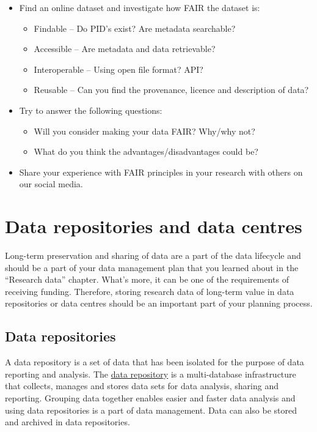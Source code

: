 \documentclass[
]{book}
\providecommand{\tightlist}{%
  \setlength{\itemsep}{0pt}\setlength{\parskip}{0pt}}
\begin{document}
\begin{itemize}
\item
  Find an online dataset and investigate how FAIR the dataset is:

  \begin{itemize}
  \tightlist
  \item
    Findable -- Do PID's exist? Are metadata searchable?
  \item
    Accessible -- Are metadata and data retrievable?
  \item
    Interoperable -- Using open file format? API?
  \item
    Reusable -- Can you find the provenance, licence and description of data?
  \end{itemize}
\item
  Try to answer the following questions:

  \begin{itemize}
  \tightlist
  \item
    Will you consider making your data FAIR? Why/why not?
  \item
    What do you think the advantages/disadvantages could be?
  \end{itemize}
\item
  Share your experience with FAIR principles in your research with others on our social media.
\end{itemize}

\hypertarget{data-repositories-and-data-centres}{%
\chapter{Data repositories and data centres}\label{data-repositories-and-data-centres}}

Long-term preservation and sharing of data are a part of the data lifecycle and should be a part of your data management plan that you learned about in the ``Research data'' chapter. What's more, it can be one of the requirements of receiving funding. Therefore, storing research data of long-term value in data repositories or data centres should be an important part of your planning process.

\hypertarget{data-repositories}{%
\section{Data repositories}\label{data-repositories}}

A data repository is a set of data that has been isolated for the purpose of data reporting and analysis. The \href{http://digitalguardian.com/blog/what-data-repository}{data repository} is a multi-database infrastructure that collects, manages and stores data sets for data analysis, sharing and reporting. Grouping data together enables easier and faster data analysis and using data repositories is a part of data management. Data can also be stored and archived in data repositories.
\end{document}
